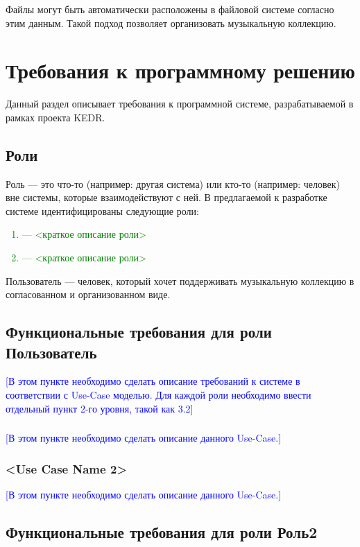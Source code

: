\documentclass[pdftex,12pt,a4paper]{report}
\providecommand{\comment}[1]{\textcolor{blue}{#1}}
\providecommand{\replace}[1]{\textcolor{green}{#1}}
\begin{document}
Файлы могут быть автоматически расположены в файловой системе согласно этим данным.
Такой подход позволяет организовать музыкальную коллекцию.

\section{Требования к программному решению}
Данный раздел описывает требования к программной системе, разрабатываемой в рамках проекта KEDR.

\subsection{Роли}
Роль --- это что-то (например: другая система) или кто-то (например: человек) вне системы, которые взаимодействуют с ней. В предлагаемой к разработке системе идентифицированы следующие роли:
\replace{
	\begin{enumerate}
		\item <Роль1> --- <краткое описание роли>
		\item <Роль2> --- <краткое описание роли>
	\end{enumerate}
}

Пользователь --- человек, который хочет поддерживать музыкальную коллекцию в согласованном и организованном виде.

\subsection{Функциональные требования для роли Пользователь}
\comment{[В этом пункте необходимо сделать описание требований к системе в соответствии с Use-Case моделью. Для каждой роли необходимо ввести отдельный пункт 2-го уровня, такой как 3.2]}

\subsubsection{}
\comment{[В этом пункте необходимо сделать описание данного Use-Case.]}

\subsubsection{<Use Case Name 2>}
\comment{[В этом пункте необходимо сделать описание данного Use-Case.]}

\subsection{Функциональные требования для роли Роль2}
\end{document}
